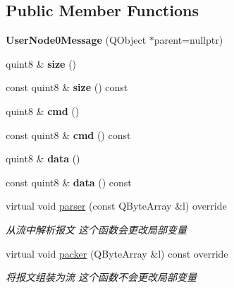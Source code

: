 \subsection*{Public Member Functions}
\begin{DoxyCompactItemize}
\item 
\mbox{\label{class_user_node0_message_a1154016d8712e4dbaa452a272aa6dce3}} 
{\bfseries User\+Node0\+Message} (Q\+Object $\ast$parent=nullptr)
\item 
\mbox{\label{class_user_node0_message_a5e094ef4bf8d4dbfe04bd2c174216d72}} 
quint8 \& {\bfseries size} ()
\item 
\mbox{\label{class_user_node0_message_adf8565680ff0eb5412de0fe1e9f9feaa}} 
const quint8 \& {\bfseries size} () const
\item 
\mbox{\label{class_user_node0_message_a65dfe6e947e946ef3428c840f759c7c1}} 
quint8 \& {\bfseries cmd} ()
\item 
\mbox{\label{class_user_node0_message_a3df419a19e8f2319ff3e34d5828cced7}} 
const quint8 \& {\bfseries cmd} () const
\item 
\mbox{\label{class_user_node0_message_a9f5eb639b215058c43f0f4f3b06b14eb}} 
quint8 \& {\bfseries data} ()
\item 
\mbox{\label{class_user_node0_message_a7b722314c079aa56bd21f7ddb990aa1d}} 
const quint8 \& {\bfseries data} () const
\item 
virtual void \mbox{\hyperlink{class_user_node0_message_a867122dceecf61ef1b09c30b95806914}{parser}} (const Q\+Byte\+Array \&l) override
\begin{DoxyCompactList}\small\item\em 从流中解析报文 这个函数会更改局部变量 \end{DoxyCompactList}\item 
virtual void \mbox{\hyperlink{class_user_node0_message_af4ceb228dafb4a573ec54c89fa1075f5}{packer}} (Q\+Byte\+Array \&l) const override
\begin{DoxyCompactList}\small\item\em 将报文组装为流 这个函数不会更改局部变量 \end{DoxyCompactList}\end{DoxyCompactItemize}



